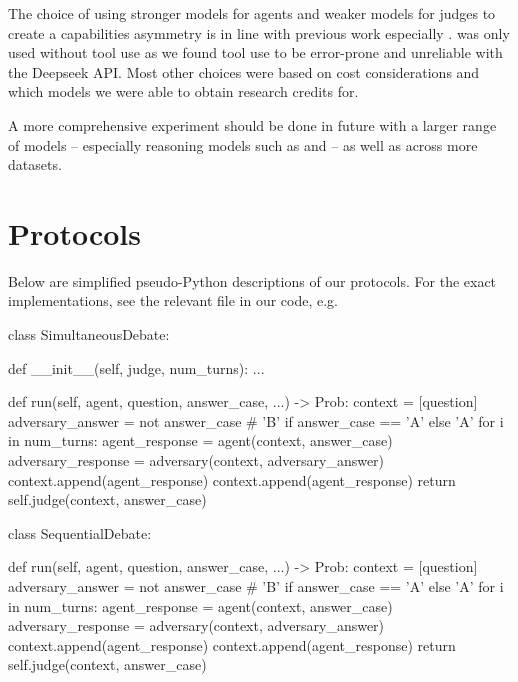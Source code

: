\begin{subappendices}
The choice of using stronger models for agents and weaker models for judges to create a capabilities asymmetry is in line with previous work especially \citet{kentonScalableOversightWeak2024}. \deepseek{} was only used without tool use as we found tool use to be error-prone and unreliable with the Deepseek API. Most other choices were based on cost considerations and which models we were able to obtain research credits for.

A more comprehensive experiment should be done in future with a larger range of models -- especially reasoning models such as \deepseekr{} and \othreemini{} -- as well as across more datasets.
\section{Protocols}
\label{solib:app:protocols}

Below are simplified pseudo-Python descriptions of our protocols. For the exact implementations, see the relevant file in our code, e.g. 

\begin{python}
class SimultaneousDebate:

  def __init__(self, judge, num_turns):
    ...
  
  def run(self, agent, question, answer_case, ...) -> Prob:
    context = [question]
    adversary_answer = not answer_case # 'B' if answer_case == 'A' else 'A'
    for i in num_turns:
      agent_response = agent(context, answer_case)
      adversary_response = adversary(context, adversary_answer)
      context.append(agent_response)
      context.append(agent_response)
    return self.judge(context, answer_case)
  
\end{python}

\begin{python}
class SequentialDebate:
  
  def run(self, agent, question, answer_case, ...) -> Prob:
    context = [question]
    adversary_answer = not answer_case # 'B' if answer_case == 'A' else 'A'
    for i in num_turns:
      agent_response = agent(context, answer_case)
      adversary_response = adversary(context, adversary_answer)
      context.append(agent_response)
      context.append(agent_response)
    return self.judge(context, answer_case)
  
\end{python}


\end{subappendices}
